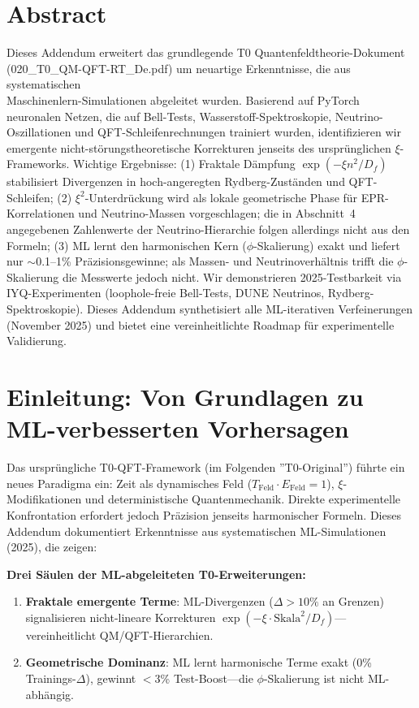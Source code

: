 \section*{Abstract}
		Dieses Addendum erweitert das grundlegende T0 Quantenfeldtheorie-Dokument (020\_T0\_QM-QFT-RT\_De.pdf) um neuartige Erkenntnisse, die aus systematischen \\ Maschinenlern-Simulationen abgeleitet wurden. Basierend auf PyTorch neuronalen Netzen, die auf Bell-Tests, Wasserstoff-Spektroskopie, Neutrino-Oszillationen und QFT-Schleifenrechnungen trainiert wurden, identifizieren wir emergente nicht-störungstheoretische Korrekturen jenseits des ursprünglichen $\xi$-Frameworks. Wichtige Ergebnisse: (1) Fraktale Dämpfung $\exp(-\xi n^2/D_f)$ stabilisiert Divergenzen in hoch-angeregten Rydberg-Zuständen und QFT-Schleifen; (2) $\xi^2$-Unterdrückung wird als lokale geometrische Phase für EPR-Korrelationen und Neutrino-Massen vorgeschlagen; die in Abschnitt~4 angegebenen Zahlenwerte der Neutrino-Hierarchie folgen allerdings nicht aus den Formeln; (3) ML lernt den harmonischen Kern ($\phi$-Skalierung) exakt und liefert nur $\sim$0.1--1\% Präzisionsgewinne; als Massen- und Neutrinoverhältnis trifft die $\phi$-Skalierung die Messwerte jedoch nicht. Wir demonstrieren 2025-Testbarkeit via IYQ-Experimenten (loophole-freie Bell-Tests, DUNE Neutrinos, Rydberg-Spektroskopie). Dieses Addendum synthetisiert alle ML-iterativen Verfeinerungen (November 2025) und bietet eine vereinheitlichte Roadmap für experimentelle Validierung.

	
	
	\section{Einleitung: Von Grundlagen zu ML-verbesserten Vorhersagen}
	
	Das ursprüngliche T0-QFT-Framework (im Folgenden ''T0-Original'') führte ein neues Paradigma ein: Zeit als dynamisches Feld ($T_{\text{Feld}} \cdot E_{\text{Feld}} = 1$), $\xi$-Modifikationen und deterministische Quantenmechanik. Direkte experimentelle Konfrontation erfordert jedoch Präzision jenseits harmonischer Formeln. Dieses Addendum dokumentiert Erkenntnisse aus systematischen ML-Simulationen (2025), die zeigen:
	
	\begin{tcolorbox}[colback=green!5!white,colframe=green!75!black,title={Zentrale ML-Ergebnisse}]
		\textbf{Drei Säulen der ML-abgeleiteten T0-Erweiterungen:}
		\begin{enumerate}
			\item \textbf{Fraktale emergente Terme}: ML-Divergenzen ($\Delta>10\%$ an Grenzen) signalisieren nicht-lineare Korrekturen $\exp(-\xi \cdot \text{Skala}^2/D_f)$—vereinheitlicht QM/QFT-Hierarchien.
			\item \textbf{Geometrische Dominanz}: ML lernt harmonische Terme exakt (0\% Trainings-$\Delta$), gewinnt $<$3\% Test-Boost—die $\phi$-Skalierung ist nicht ML-abhängig.
		\end{enumerate}
	\end{tcolorbox}
	
